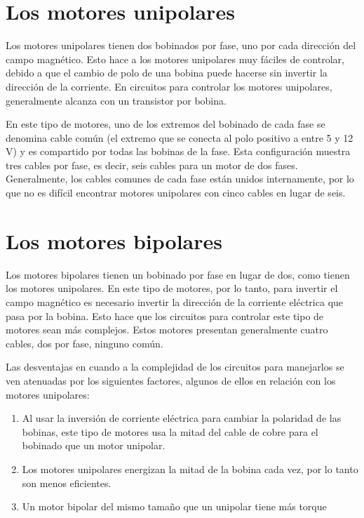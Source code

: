 \documentclass[final,narroweqnarray,inline,twoside]{ieee}
\begin{document}
\section{Los motores unipolares}
Los motores unipolares tienen dos bobinados por fase, uno por cada dirección del campo magnético. Esto hace a los motores
unipolares muy fáciles de controlar, debido a que el cambio de polo de una bobina puede hacerse sin invertir la dirección de
la corriente. En circuitos para controlar los motores unipolares, generalmente alcanza con un transistor por bobina.

En este tipo de motores, uno de los extremos del bobinado de cada fase se denomina cable común (el extremo que se conecta al
polo positivo a entre 5 y 12 V) y es compartido por todas las bobinas de la fase. Esta configuración muestra tres cables por
fase, es decir, seis cables para un motor de dos fases. Generalmente, los cables comunes de cada fase están unidos
internamente, por lo que no es difícil encontrar motores unipolares con cinco cables en lugar de seis.

\section{Los motores bipolares}
Los motores bipolares tienen un bobinado por fase en lugar de dos, como tienen los motores unipolares. En este tipo de
motores, por lo tanto, para invertir el campo magnético es necesario invertir la dirección de la corriente eléctrica que
pasa por la bobina. Esto hace que los circuitos para controlar este tipo de motores sean más complejos. Estos motores
presentan generalmente cuatro cables, dos por fase, ninguno común.

Las desventajas en cuando a la complejidad de los circuitos para manejarlos se ven atenuadas por los siguientes factores,
algunos de ellos en relación con los motores unipolares:
\begin{enumerate}
 \item Al usar la inversión de corriente eléctrica para cambiar la polaridad de las bobinas, este tipo de motores usa la
mitad del cable de cobre para el bobinado que un motor unipolar. 
 \item Los motores unipolares energizan la mitad de la bobina cada vez, por lo tanto son menos eficientes.
 \item Un motor bipolar del mismo tamaño que un unipolar tiene más torque %
\end{enumerate}
\end{document}
